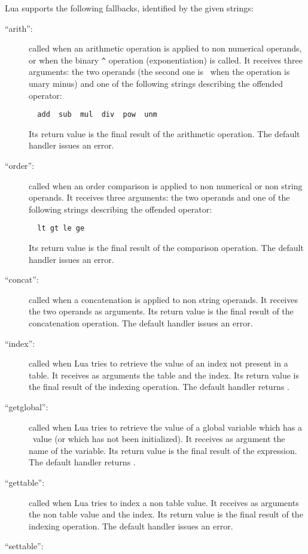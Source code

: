 Lua supports the following fallbacks,
identified by the given strings:
\begin{description}
\item[``arith'':]
called when an arithmetic operation is applied to non numerical operands,
or when the binary \verb'^' operation (exponentiation) is called.
It receives three arguments:
the two operands (the second one is \nil\ when the operation is unary minus)
and one of the following strings describing the offended operator:
\begin{verbatim}
  add  sub  mul  div  pow  unm
\end{verbatim}
Its return value is the final result of the arithmetic operation.
The default handler issues an error.
\item[``order'':]
called when an order comparison is applied to non numerical or
non string operands.
It receives three arguments:
the two operands and
one of the following strings describing the offended operator:
\begin{verbatim}
  lt gt le ge
\end{verbatim}
Its return value is the final result of the comparison operation.
The default handler issues an error.
\item[``concat'':]
called when a concatenation is applied to non string operands.
It receives the two operands as arguments.
Its return value is the final result of the concatenation operation.
The default handler issues an error.
\item[``index'':]
called when Lua tries to retrieve the value of an index
not present in a table.
It receives as arguments the table and the index.
Its return value is the final result of the indexing operation.
The default handler returns \nil.
\item[``getglobal'':]
called when Lua tries to retrieve the value of a global variable
which has a \nil\ value (or which has not been initialized).
It receives as argument the name of the variable.
Its return value is the final result of the expression.
The default handler returns \nil.
\item[``gettable'':]
called when Lua tries to index a non table value.
It receives as arguments the non table value and the index.
Its return value is the final result of the indexing operation.
The default handler issues an error.
\item[``settable'':]

\end{description}
